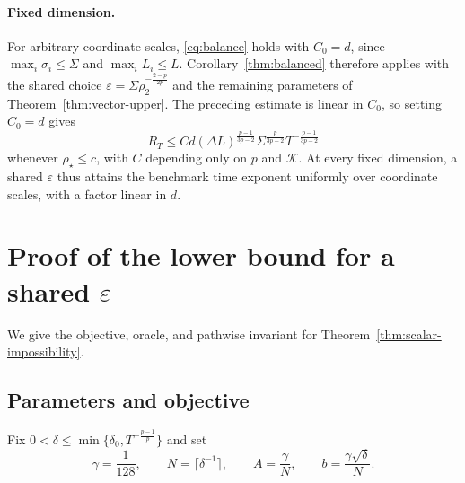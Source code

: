 \documentclass[11pt,letterpaper]{article}
\theoremstyle{definition}
\newcommand{\eps}{\varepsilon}
\begin{document}
\paragraph{Fixed dimension.}
For arbitrary coordinate scales, \eqref{eq:balance} holds with $C_0=d$,
since $\max_i\sigma_i\le\Sigma$ and $\max_iL_i\le L$.
Corollary~\ref{thm:balanced} therefore applies with the shared choice
$\eps=\Sigma\rho_2^{-\frac{2-p}{2p}}$ and the remaining parameters
of Theorem~\ref{thm:vector-upper}. The preceding estimate is linear in
$C_0$, so setting $C_0=d$ gives
\[
R_T\le Cd
(\Delta L)^{\frac{p-1}{3p-2}}
\Sigma^{\frac{p}{3p-2}}T^{-\frac{p-1}{3p-2}}
\]
whenever $\rho_\star\le c$, with $C$ depending only on $p$ and
$\mathcal K$. At every fixed dimension, a shared $\eps$ thus attains
the benchmark time exponent uniformly over coordinate scales,
with a factor linear in $d$.

\section{Proof of the lower bound for a shared \texorpdfstring{$\eps$}{epsilon}}
\label{app:lower}

We give the objective, oracle, and pathwise invariant for
Theorem~\ref{thm:scalar-impossibility}.

\subsection{Parameters and objective}

Fix $0<\delta\le\min\{\delta_0,T^{-\frac{p-1}{p}}\}$ and set
\begin{equation}
\gamma=\frac1{128},
\qquad
N=\lceil\delta^{-1}\rceil,
\qquad
A=\frac{\gamma}{N},
\qquad
b=\frac{\gamma\sqrt\delta}{N}.
\label{eq:lower-parameters}
\end{equation}
\end{document}
